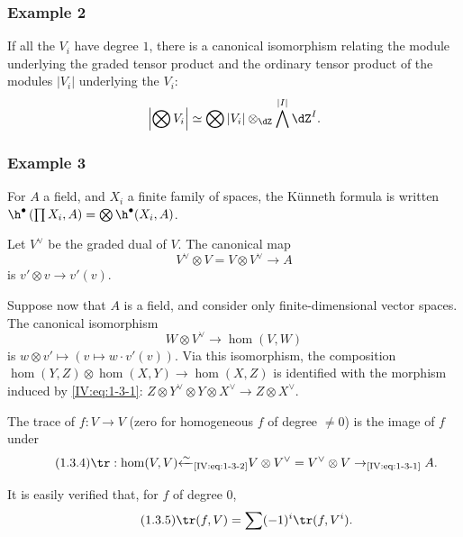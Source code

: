 \documentclass[oneside]{book}
\begin{document}
\subsubsection*{\hypertarget{sga4half.e04.example.1-3-2}{Example 2}}

If all the $V_i$ have degree $1$, there is a canonical isomorphism relating
the module underlying the graded tensor product and the ordinary tensor
product of the modules $|V_i|$ underlying the $V_i$:
\[
  \left|\bigotimes V_i\right| \simeq \bigotimes |V_i|\otimes_{\dZ}\bigwedge^{|I|}\dZ^I \text{.}
\]






\subsubsection*{\hypertarget{sga4half.e04.example.1-3-3}{Example 3}}

For $A$ a field, and $X_i$ a finite family of spaces, the K\"unneth formula
is written
$\h^\bullet\left(\prod X_i,A\right) = \bigotimes \h^\bullet(X_i,A)$.

Let $V^\vee$ be the graded dual of $V$. The canonical map
\begin{equation*}\tag{1.3.1}\label{IV:eq:1-3-1}
  V^\vee\otimes V = V\otimes V^\vee \to A
\end{equation*}
is $v'\otimes v\to v'(v)$.

Suppose now that $A$ is a field, and consider only finite-dimensional vector
spaces. The canonical isomorphism
\begin{equation*}\tag{1.3.2}\label{IV:eq:1-3-2}
  W\otimes V^\vee \to \hom(V,W)
\end{equation*}
is $w\otimes v'\mapsto \left(v\mapsto w\cdot v'(v)\right)$. Via this
isomorphism, the composition
$\hom(Y,Z)\otimes \hom(X,Y)\to \hom(X,Z)$ is identified with the morphism
induced by \eqref{IV:eq:1-3-1}:
$Z\otimes Y^\vee\otimes Y\otimes X^\vee \to Z\otimes X^\vee$.

The trace of $f:V\to V$ (zero for homogeneous $f$ of degree $\ne 0$) is
the image of $f$ under
\begin{equation*}\tag{1.3.4}\label{IV:eq:1-3-4}
  \tr:\hom(V,V) {\xleftarrow\sim}_\text{\eqref{IV:eq:1-3-2}} V\otimes V^\vee = V^\vee \otimes V \to_\text{\eqref{IV:eq:1-3-1}} A .
\end{equation*}

It is easily verified that, for $f$ of degree $0$,
\begin{equation*}\tag{1.3.5}\label{IV:eq:1-3-5}
  \tr(f,V) = \sum (-1)^i \tr(f,V^i) \text{.}
\end{equation*}
\end{document}
